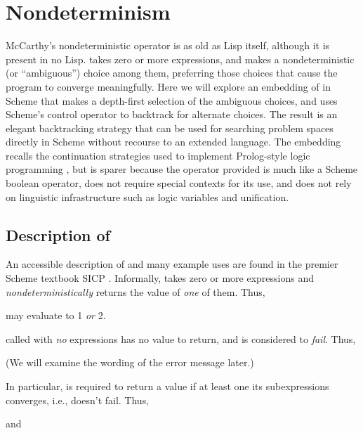 \chapter{Nondeterminism}

McCarthy’s nondeterministic operator
 \cite{jmc:amb,wc:amb,zmc:amb} is as old as
Lisp itself, although it is present in no Lisp.
 takes zero or more expressions, and makes a
nondeterministic (or “ambiguous”) choice among them,
preferring those choices that cause the program to
converge meaningfully.  Here we will explore an
embedding of  in Scheme that makes a depth-first
selection of the ambiguous choices, and uses Scheme’s
control operator  to backtrack for alternate
choices.  The result is an elegant backtracking
strategy that can be used for searching problem spaces
directly in Scheme without recourse to an extended
language.  The embedding recalls the continuation
strategies used to implement Prolog-style logic
programming \cite{logick,mf:prolog}, but is sparer because the
operator provided is much like a Scheme boolean
operator, does not require special contexts for its
use, and does not rely on linguistic infrastructure
such as logic variables and unification.

\section{Description of }

An accessible description of  and many example
uses are found in the premier Scheme textbook
SICP \cite{sicp}.  Informally,
 takes zero or more expressions and {\em
nondeterministically} returns the value of {\em one} of
them.  Thus,


\n may evaluate to 1 {\em or} 2.

 called with {\em no} expressions has no
value to return, and is considered to {\em fail}.
Thus,


\n (We will examine the wording of the error message later.)

In particular,  is required to return a value if at
least one its subexpressions converges, i.e., doesn’t fail.
Thus,


\n and

